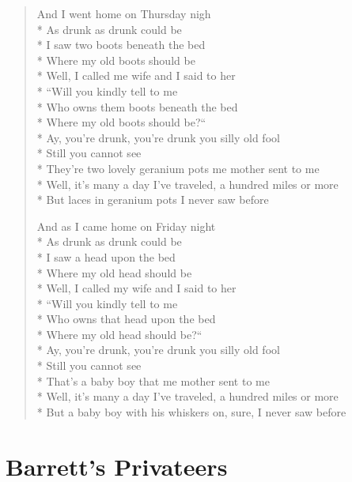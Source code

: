 \documentclass[9pt,twoside]{extarticle}
\newenvironment{xverse}{
	\begin{verse}
	\fontsize{8.5}{10.5}\selectfont
	}
	{
	\end{verse}
	\penalty 0
}
\begin{document}
\begin{xverse}
And I went home on Thursday nigh \\*
As drunk as drunk could be \\*
I saw two boots beneath the bed \\*
Where my old boots should be \\*
Well, I called me wife and I said to her \\*
“Will you kindly tell to me \\*
Who owns them boots beneath the bed \\*
Where my old boots should be?“ \\*
Ay, you’re drunk, you’re drunk you silly old fool \\*
Still you cannot see \\*
They’re two lovely geranium pots me mother sent to me \\*
Well, it’s many a day I’ve traveled, a hundred miles or more \\*
But laces in geranium pots I never saw before

And as I came home on Friday night \\*
As drunk as drunk could be \\*
I saw a head upon the bed \\*
Where my old head should be \\*
Well, I called my wife and I said to her \\*
“Will you kindly tell to me \\*
Who owns that head upon the bed \\*
Where my old head should be?“ \\*
Ay, you’re drunk, you’re drunk you silly old fool \\*
Still you cannot see \\*
That’s a baby boy that me mother sent to me \\*
Well, it’s many a day I’ve traveled, a hundred miles or more \\*
But a baby boy with his whiskers on, sure, I never saw before
\end{xverse}

\section{Barrett’s Privateers}
\end{document}
